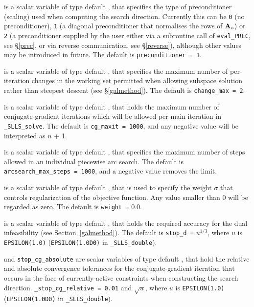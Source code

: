 \documentclass{galahad}
\newcommand{\packagename}{SLLS}
\newcommand{\fullpackagename}{\libraryname\_\packagename}
\newcommand{\solver}{{\tt \fullpackagename\_solve}}
\begin{document}
\begin{description}
 is a scalar variable of type default \integer, that
specifies the type of preconditioner (scaling) used when computing the
search direction. Currently this can be 
{\tt 0} (no preconditioner), 
{\tt 1} (a diagonal preconditioner that normalises the rows of ${\mathbf{A}}_o$) or
{\tt 2} (a preconditioner supplied by the user either via a subroutine
call of {\tt eval\_PREC}, see \S\ref{prec}, or via reverse communication, 
see \S\ref{reverse}),
although other values may be introduced
in future. The default is {\tt preconditioner = 1}.

 is a scalar variable of type default \integer, that
specifies the maximum number of per-iteration changes in the working set
permitted when allowing subspace solution rather than steepest descent
(see \S\ref{galmethod}).
The default is {\tt change\_max = 2}.

 is a scalar variable of type default \integer, that holds the
maximum number of conjugate-gradient iterations which will be allowed
per main iteration in \solver.
The default is {\tt cg\_maxit = 1000}, and any negative value will
be interpreted as $n$ + 1.

 is a scalar variable of type default \integer,
that specifies the maximum number of steps allowed in an individual
piecewise arc search.
The default is {\tt arcsearch\_max\_steps = 1000}, and a negative value
removes the limit.

 is a scalar variable of type default \realdp, that is used to
specify the weight $\sigma$ that controls regularization of the objective 
function. Any value smaller than $0$ will be regarded as zero.
The default is {\tt weight =} $0.0$.

 is a scalar variable of type default
\realdp, that holds the
required accuracy for the dual infeasibility (see Section~\ref{galmethod}).
The default is {\tt stop\_d =} $u^{1/3}$,
where $u$ is {\tt EPSILON(1.0)} ({\tt EPSILON(1.0D0)} in
{\tt \fullpackagename\_double}).

 and {\tt stop\_cg\_absolute}
are scalar variables of type default \realdp,
that hold the relative and absolute convergence tolerances for the
conjugate-gradient iteration that occurs in the face of currently-active
constraints when constructing the search direction.
{\tt \_stop\_cg\_relative = 0.01}
and  $\sqrt{u}$,
where $u$ is {\tt EPSILON(1.0)} ({\tt EPSILON(1.0D0)} in
{\tt \fullpackagename\_double}).


\end{description}
\end{document}
